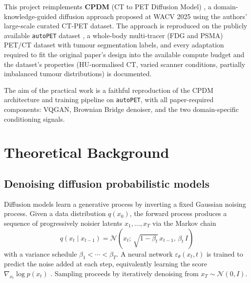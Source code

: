 \documentclass[11pt,a4paper]{article}
\begin{document}
This project reimplements \textbf{CPDM} (CT to PET Diffusion Model) \parencite{nguyen2025cpdm}, 
a domain-knowledge-guided diffusion approach proposed at WACV 2025 using the authors' 
large-scale curated CT-PET dataset. The approach is reproduced on the publicly 
available \texttt{autoPET} dataset \parencite{gatidis2022autopet, jeblick2024psma}, a whole-body
multi-tracer (FDG and PSMA) PET/CT dataset with tumour segmentation labels, and every adaptation required
to fit the original paper's design into the available compute budget and the dataset's 
properties (HU-normalised CT, varied scanner conditions, partially imbalanced 
tumour distributions) is documented.

The aim of the practical work is a faithful reproduction of the CPDM architecture 
and training pipeline on \texttt{autoPET}, with all paper-required 
components: VQGAN, Brownian Bridge denoiser, and the two domain-specific 
conditioning signals.

\section{Theoretical Background}

\subsection{Denoising diffusion probabilistic models}

Diffusion models \parencite{sohldickstein2015deep, ho2020denoising, song2021scorebased} learn a generative process by inverting a fixed Gaussian noising process. Given a data distribution $q(x_0)$, the forward process produces a sequence of progressively noisier latents $x_1, \ldots, x_T$ via the Markov chain
\begin{equation}
q(x_t \mid x_{t-1}) = \mathcal{N}\!\left(x_t;\, \sqrt{1 - \beta_t}\, x_{t-1},\, \beta_t\, I\right)
\end{equation}
with a variance schedule $\beta_1 < \cdots < \beta_T$. A neural network 
$\varepsilon_\theta(x_t, t)$ is trained to predict the noise added at each 
step, equivalently learning the score $\nabla_{x_t} \log p(x_t)$ \parencite{song2021scorebased}. Sampling 
proceeds by iteratively denoising from $x_T \sim \mathcal{N}(0, I)$.
\end{document}
